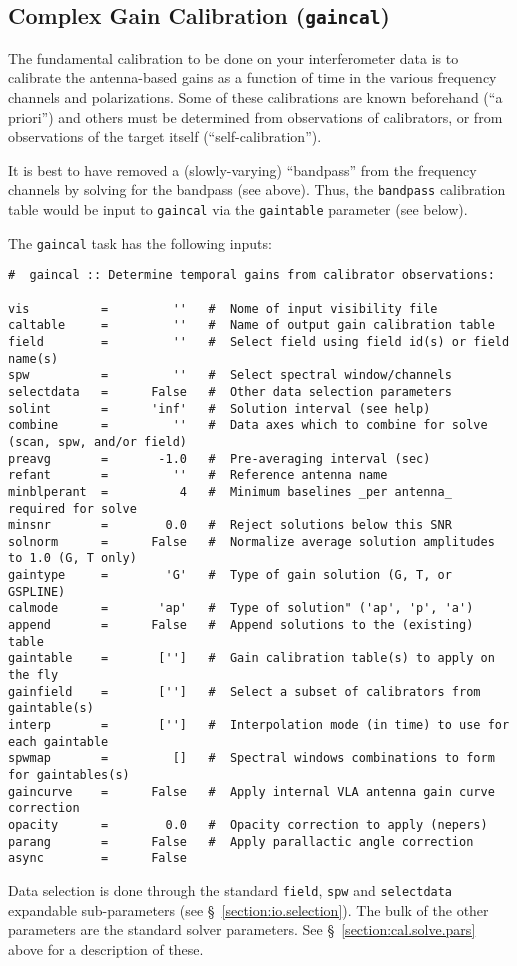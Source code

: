 \subsection{Complex Gain Calibration ({\tt gaincal})}
\label{section:cal.solve.gain}

The fundamental calibration to be done on your interferometer data
is to calibrate the antenna-based gains as a function of time in
the various frequency channels and polarizations.  Some of
these calibrations are known beforehand (``a priori'') and others
must be determined from observations of calibrators, or from observations
of the target itself (``self-calibration'').

It is best to have removed a (slowly-varying) ``bandpass'' from the
frequency channels by solving for the bandpass (see above).  Thus,
the {\tt bandpass} calibration table would be input to {\tt gaincal} via
the {\tt gaintable} parameter (see below).

The {\tt gaincal} task has the following inputs:
\small
\begin{verbatim}
#  gaincal :: Determine temporal gains from calibrator observations:

vis          =         ''   #  Nome of input visibility file
caltable     =         ''   #  Name of output gain calibration table
field        =         ''   #  Select field using field id(s) or field name(s)
spw          =         ''   #  Select spectral window/channels
selectdata   =      False   #  Other data selection parameters
solint       =      'inf'   #  Solution interval (see help)
combine      =         ''   #  Data axes which to combine for solve (scan, spw, and/or field)
preavg       =       -1.0   #  Pre-averaging interval (sec)
refant       =         ''   #  Reference antenna name
minblperant  =          4   #  Minimum baselines _per antenna_ required for solve
minsnr       =        0.0   #  Reject solutions below this SNR
solnorm      =      False   #  Normalize average solution amplitudes to 1.0 (G, T only)
gaintype     =        'G'   #  Type of gain solution (G, T, or GSPLINE)
calmode      =       'ap'   #  Type of solution" ('ap', 'p', 'a')
append       =      False   #  Append solutions to the (existing) table
gaintable    =       ['']   #  Gain calibration table(s) to apply on the fly
gainfield    =       ['']   #  Select a subset of calibrators from gaintable(s)
interp       =       ['']   #  Interpolation mode (in time) to use for each gaintable
spwmap       =         []   #  Spectral windows combinations to form for gaintables(s)
gaincurve    =      False   #  Apply internal VLA antenna gain curve correction
opacity      =        0.0   #  Opacity correction to apply (nepers)
parang       =      False   #  Apply parallactic angle correction
async        =      False   
\end{verbatim}
\normalsize
Data selection is done through the standard {\tt field}, {\tt spw} and 
{\tt selectdata} expandable sub-parameters (see \S~\ref{section:io.selection}).
The bulk of the other parameters are the standard solver parameters.  See
\S~\ref{section:cal.solve.pars} above for a description of these.

